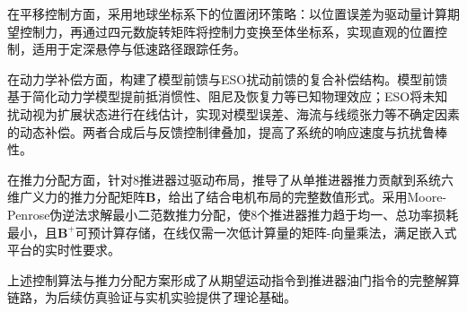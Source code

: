 在平移控制方面，采用地球坐标系下的位置闭环策略：以位置误差为驱动量计算期望控制力，再通过四元数旋转矩阵将控制力变换至体坐标系，实现直观的位置控制，适用于定深悬停与低速路径跟踪任务。

在动力学补偿方面，构建了模型前馈与ESO扰动前馈的复合补偿结构。模型前馈基于简化动力学模型提前抵消惯性、阻尼及恢复力等已知物理效应；ESO将未知扰动视为扩展状态进行在线估计，实现对模型误差、海流与线缆张力等不确定因素的动态补偿。两者合成后与反馈控制律叠加，提高了系统的响应速度与抗扰鲁棒性。

在推力分配方面，针对8推进器过驱动布局，推导了从单推进器推力贡献到系统六维广义力的推力分配矩阵$\boldsymbol{B}$，给出了结合电机布局的完整数值形式。采用Moore-Penrose伪逆法求解最小二范数推力分配，使8个推进器推力趋于均一、总功率损耗最小，且$\boldsymbol{B}^+$可预计算存储，在线仅需一次低计算量的矩阵-向量乘法，满足嵌入式平台的实时性要求。

上述控制算法与推力分配方案形成了从期望运动指令到推进器油门指令的完整解算链路，为后续仿真验证与实机实验提供了理论基础。